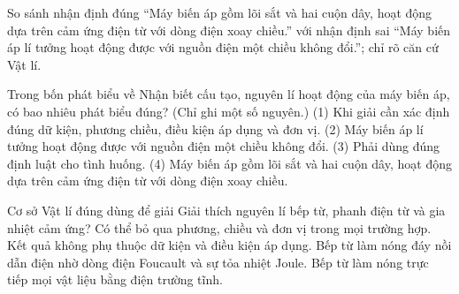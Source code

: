 \begin{bt}
So sánh nhận định đúng “Máy biến áp gồm lõi sắt và hai cuộn dây, hoạt động dựa trên cảm ứng điện từ với dòng điện xoay chiều.” với nhận định sai “Máy biến áp lí tưởng hoạt động được với nguồn điện một chiều không đổi.”; chỉ rõ căn cứ Vật lí.
\end{bt}

\begin{ex}
Trong bốn phát biểu về Nhận biết cấu tạo, nguyên lí hoạt động của máy biến áp, có bao nhiêu phát biểu đúng? (Chỉ ghi một số nguyên.) (1) Khi giải cần xác định đúng dữ kiện, phương chiều, điều kiện áp dụng và đơn vị. (2) Máy biến áp lí tưởng hoạt động được với nguồn điện một chiều không đổi. (3) Phải dùng đúng định luật cho tình huống. (4) Máy biến áp gồm lõi sắt và hai cuộn dây, hoạt động dựa trên cảm ứng điện từ với dòng điện xoay chiều.
\end{ex}

\begin{ex}
Cơ sở Vật lí đúng dùng để giải Giải thích nguyên lí bếp từ, phanh điện từ và gia nhiệt cảm ứng?
\choice
{Có thể bỏ qua phương, chiều và đơn vị trong mọi trường hợp.}
{Kết quả không phụ thuộc dữ kiện và điều kiện áp dụng.}
{\True Bếp từ làm nóng đáy nồi dẫn điện nhờ dòng điện Foucault và sự tỏa nhiệt Joule.}
{Bếp từ làm nóng trực tiếp mọi vật liệu bằng điện trường tĩnh.}
\end{ex}

